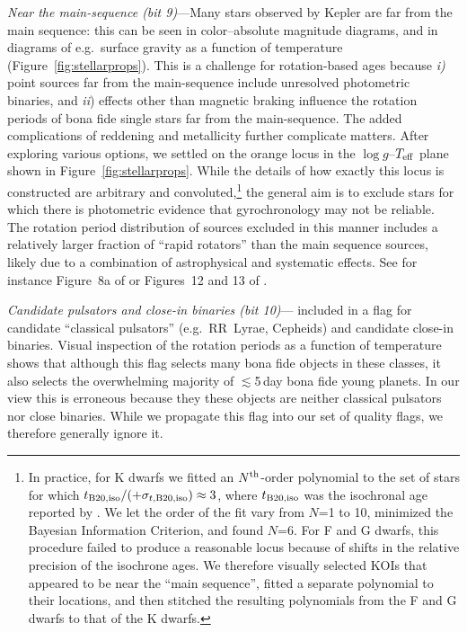 \documentclass[11pt,twocolumn,tighten]{aastex63}
\begin{document}
{\it Near the main-sequence (bit 9)}---Many stars observed by Kepler
are far from the main sequence: this can be seen in color--absolute
magnitude diagrams, and in diagrams of e.g.~surface gravity as a
function of temperature (Figure~\ref{fig:stellarprops}).  This is a
challenge for rotation-based ages because {\it i)} point sources
far from the main-sequence include unresolved photometric binaries,
and {\it ii}) effects other than magnetic braking influence the
rotation periods of bona fide single stars far from the main-sequence.
The added complications of reddening and metallicity further
complicate matters.  
After exploring various options, we settled on the orange locus in the
$\log g$--$T_{\rm eff}$ plane shown in Figure~\ref{fig:stellarprops}.
While the details of how exactly this locus is constructed are
arbitrary and convoluted,\footnote{In practice, for K dwarfs we fitted an
$N^{\rm th}$-order polynomial to the set of stars for which $t_{\rm
B20,iso}/(+\sigma_{t,{\rm B20,iso}})\approx 3$, where
$t_{\rm B20,iso}$ was the isochronal age reported by
\citet{Berger_2020a_catalog}. We let the order of the fit vary from
$N$=1 to 10, minimized the Bayesian Information Criterion,
and found $N$=6.  For F and G dwarfs, this procedure failed to produce
a reasonable locus because of shifts in the relative precision of
the isochrone ages.  We therefore visually selected KOIs that appeared
to be near the ``main sequence'', fitted a separate polynomial to
their locations, and then stitched the resulting polynomials from the
F and G dwarfs to that of the K dwarfs.} the general 
aim is to exclude stars for which there is photometric evidence
that gyrochronology may not be reliable.  The rotation period
distribution of sources excluded in this manner includes a relatively
larger fraction of ``rapid rotators'' than the main sequence sources,
likely due to a combination of astrophysical and systematic effects.
See for instance Figure~8a of \citet{2022AJ....164..137K} or Figures~12 and 13
of \citet{2023ApJS..268....4F}.


{\it Candidate pulsators and close-in binaries (bit
10)}---\citeauthor{Santos_2021} included in a flag for candidate
``classical pulsators'' (e.g.\ RR~Lyrae, Cepheids) and candidate
close-in binaries.  Visual inspection of the rotation periods as a
function of temperature shows that although this flag selects many
bona fide objects in these classes, it also selects the overwhelming
majority of $\lesssim$5\,day bona fide young planets.  In our view this is
erroneous because they these objects are neither classical pulsators nor
close binaries.  While we
propagate this flag into our set of quality flags, we therefore
generally ignore it.
\end{document}
